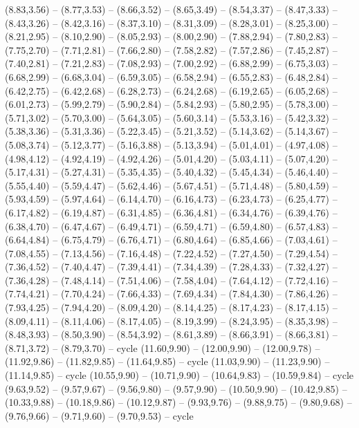 \expandafter\def\csname geo:gebiet:heute-CZE\endcsname{
  (8.83,3.56) -- (8.77,3.53) -- (8.66,3.52) -- (8.65,3.49) -- (8.54,3.37) -- (8.47,3.33) -- (8.43,3.26) -- (8.42,3.16) -- (8.37,3.10) -- (8.31,3.09) -- (8.28,3.01) -- (8.25,3.00) -- (8.21,2.95) -- (8.10,2.90) -- (8.05,2.93) -- (8.00,2.90) -- (7.88,2.94) -- (7.80,2.83) -- (7.75,2.70) -- (7.71,2.81) -- (7.66,2.80) -- (7.58,2.82) -- (7.57,2.86) -- (7.45,2.87) -- (7.40,2.81) -- (7.21,2.83) -- (7.08,2.93) -- (7.00,2.92) -- (6.88,2.99) -- (6.75,3.03) -- (6.68,2.99) -- (6.68,3.04) -- (6.59,3.05) -- (6.58,2.94) -- (6.55,2.83) -- (6.48,2.84) -- (6.42,2.75) -- (6.42,2.68) -- (6.28,2.73) -- (6.24,2.68) -- (6.19,2.65) -- (6.05,2.68) -- (6.01,2.73) -- (5.99,2.79) -- (5.90,2.84) -- (5.84,2.93) -- (5.80,2.95) -- (5.78,3.00) -- (5.71,3.02) -- (5.70,3.00) -- (5.64,3.05) -- (5.60,3.14) -- (5.53,3.16) -- (5.42,3.32) -- (5.38,3.36) -- (5.31,3.36) -- (5.22,3.45) -- (5.21,3.52) -- (5.14,3.62) -- (5.14,3.67) -- (5.08,3.74) -- (5.12,3.77) -- (5.16,3.88) -- (5.13,3.94) -- (5.01,4.01) -- (4.97,4.08) -- (4.98,4.12) -- (4.92,4.19) -- (4.92,4.26) -- (5.01,4.20) -- (5.03,4.11) -- (5.07,4.20) -- (5.17,4.31) -- (5.27,4.31) -- (5.35,4.35) -- (5.40,4.32) -- (5.45,4.34) -- (5.46,4.40) -- (5.55,4.40) -- (5.59,4.47) -- (5.62,4.46) -- (5.67,4.51) -- (5.71,4.48) -- (5.80,4.59) -- (5.93,4.59) -- (5.97,4.64) -- (6.14,4.70) -- (6.16,4.73) -- (6.23,4.73) -- (6.25,4.77) -- (6.17,4.82) -- (6.19,4.87) -- (6.31,4.85) -- (6.36,4.81) -- (6.34,4.76) -- (6.39,4.76) -- (6.38,4.70) -- (6.47,4.67) -- (6.49,4.71) -- (6.59,4.71) -- (6.59,4.80) -- (6.57,4.83) -- (6.64,4.84) -- (6.75,4.79) -- (6.76,4.71) -- (6.80,4.64) -- (6.85,4.66) -- (7.03,4.61) -- (7.08,4.55) -- (7.13,4.56) -- (7.16,4.48) -- (7.22,4.52) -- (7.27,4.50) -- (7.29,4.54) -- (7.36,4.52) -- (7.40,4.47) -- (7.39,4.41) -- (7.34,4.39) -- (7.28,4.33) -- (7.32,4.27) -- (7.36,4.28) -- (7.48,4.14) -- (7.51,4.06) -- (7.58,4.04) -- (7.64,4.12) -- (7.72,4.16) -- (7.74,4.21) -- (7.70,4.24) -- (7.66,4.33) -- (7.69,4.34) -- (7.84,4.30) -- (7.86,4.26) -- (7.93,4.25) -- (7.94,4.20) -- (8.09,4.20) -- (8.14,4.25) -- (8.17,4.23) -- (8.17,4.15) -- (8.09,4.11) -- (8.11,4.06) -- (8.17,4.05) -- (8.19,3.99) -- (8.24,3.95) -- (8.35,3.98) -- (8.48,3.93) -- (8.50,3.90) -- (8.54,3.92) -- (8.61,3.89) -- (8.66,3.91) -- (8.66,3.81) -- (8.71,3.72) -- (8.79,3.70) -- cycle}
\expandafter\def\csname geo:gebiet:heute-LVA\endcsname{
  (11.60,9.90) -- (12.00,9.90) -- (12.00,9.78) -- (11.92,9.86) -- (11.82,9.85) -- (11.64,9.85) -- cycle
  (11.03,9.90) -- (11.23,9.90) -- (11.14,9.85) -- cycle
  (10.55,9.90) -- (10.71,9.90) -- (10.64,9.83) -- (10.59,9.84) -- cycle
  (9.63,9.52) -- (9.57,9.67) -- (9.56,9.80) -- (9.57,9.90) -- (10.50,9.90) -- (10.42,9.85) -- (10.33,9.88) -- (10.18,9.86) -- (10.12,9.87) -- (9.93,9.76) -- (9.88,9.75) -- (9.80,9.68) -- (9.76,9.66) -- (9.71,9.60) -- (9.70,9.53) -- cycle}
